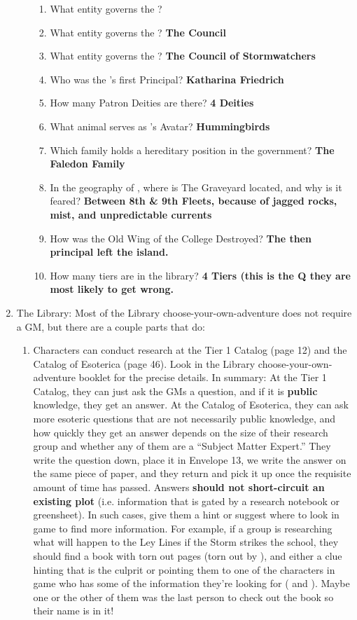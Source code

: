 \documentclass[green]{GL2020}
\begin{document}
\begin{enumerate}
\begin{enumerate}
\begin{enumerate}
			\item What entity governs the \pFarm{}?\textbf{ }
			\item What entity governs the \pTech{}? \textbf{The Council}
		\item What entity governs the \pShip{}? \textbf{The Council of Stormwatchers}
		\item  Who was the \pSchool{}’s first Principal? \textbf{Katharina Friedrich}
			\item How many Patron Deities are there? \textbf{4 Deities}
			\item What animal serves as \cFarmGod{}'s Avatar? \textbf{Hummingbirds}
			\item Which family holds a hereditary position in the \pTech{} government? \textbf{The Faledon Family}
			\item In the geography of \pEarth{}, where is The Graveyard located, and why is it feared? \textbf{Between 8th & 9th Fleets, because of jagged rocks, mist, and unpredictable currents}
		\item How was the Old Wing of the College Destroyed? \textbf{The then principal left the island.}
			\item How many tiers are in the library? \textbf{4 Tiers (this is the Q they are most likely to get wrong.}
	\end{enumerate}
	\end{enumerate}
	\item The Library: Most of the Library choose-your-own-adventure does not require a GM, but there are a couple parts that do:
	\begin{enumerate}
		\item Characters can conduct research at the Tier 1 Catalog (page 12) and the Catalog of Esoterica (page 46). Look in the Library choose-your-own-adventure booklet for the precise details. In summary: At the Tier 1 Catalog, they can just ask the GMs a question, and if it is \textbf{public} knowledge, they get an answer. At the Catalog of Esoterica, they can ask more esoteric questions that are not necessarily public knowledge, and how quickly they get an answer depends on the size of their research group and whether any of them are a “Subject Matter Expert.” They write the question down, place it in Envelope 13, we write the answer on the same piece of paper, and they return and pick it up once the requisite amount of time has passed.  Answers \textbf{should not short-circuit an existing plot} (i.e. information that is gated by a research notebook or greensheet). In such cases, give them a hint or suggest where to look in game to find more information. For example, if a group is researching what will happen to the Ley Lines if the Storm strikes the school, they should find a book with torn out pages (torn out by \cChupstudent{\full}), and either a clue hinting that \cChupstudent{} is the culprit or pointing them to one of the characters in game who has some of the information they’re looking for (\cHistory{\full} and \cBeetle{\full}). Maybe one or the other of them was the last person to check out the book so their name is in it!

\end{enumerate}
\end{enumerate}
\end{document}
